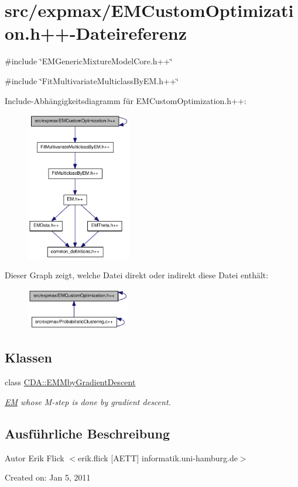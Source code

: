 \hypertarget{EMCustomOptimization_8h_09_09}{
\section{src/expmax/EMCustomOptimization.h++-\/Dateireferenz}
\label{EMCustomOptimization_8h_09_09}
}
{\ttfamily \#include \char`\"{}EMGenericMixtureModelCore.h++\char`\"{}}\par
{\ttfamily \#include \char`\"{}FitMultivariateMulticlassByEM.h++\char`\"{}}\par
Include-\/Abhängigkeitsdiagramm für EMCustomOptimization.h++:\nopagebreak
\begin{figure}[H]
\begin{center}
\leavevmode
\includegraphics[width=129pt]{EMCustomOptimization_8h_09_09__incl}
\end{center}
\end{figure}
Dieser Graph zeigt, welche Datei direkt oder indirekt diese Datei enthält:\nopagebreak
\begin{figure}[H]
\begin{center}
\leavevmode
\includegraphics[width=128pt]{EMCustomOptimization_8h_09_09__dep__incl}
\end{center}
\end{figure}
\subsection*{Klassen}
\begin{DoxyCompactItemize}
\item 
class \hyperlink{classCDA_1_1EMMbyGradientDescent}{CDA::EMMbyGradientDescent}
\begin{DoxyCompactList}\small\item\em \hyperlink{classCDA_1_1EM}{EM} whose M-\/step is done by gradient descent. \item\end{DoxyCompactList}\end{DoxyCompactItemize}


\subsection{Ausführliche Beschreibung}
\begin{DoxyAuthor}{Autor}
Erik Flick $<$erik.flick \mbox{[}AETT\mbox{]} informatik.uni-\/hamburg.de$>$
\end{DoxyAuthor}
Created on: Jan 5, 2011 